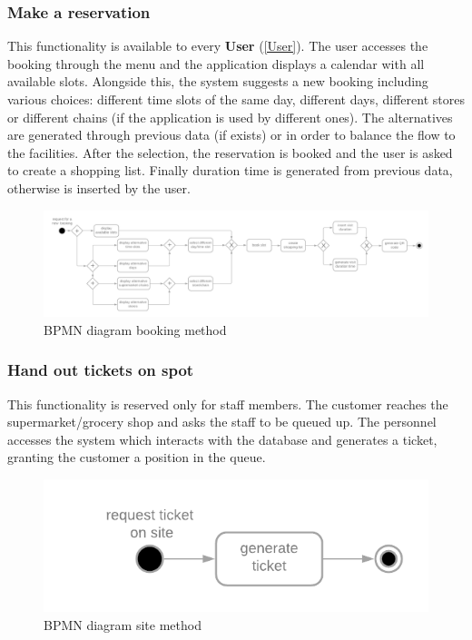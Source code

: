 \documentclass[table, 12pt]{article}
\begin{document}
\begin{flushleft}
    \subsubsection{Make a reservation}
    \label{book_a_visit}
    This functionality is available to every \textbf{User} (\ref{User}). The user accesses the booking through the menu and the application displays a calendar with all available slots. Alongside this, the system suggests a new booking including various choices: different time slots of the same day, different days, different stores or different chains (if the application is used by different ones). The alternatives are generated through previous data (if exists) or in order to balance the flow to the facilities. After the selection, the reservation is booked and the user is asked to create a shopping list. Finally duration time is generated from previous data, otherwise is inserted by the user.
    \begin{figure}[H]
        \begin{center}
            \includegraphics[scale=0.15]{assets/function-book-a-visit.png}
            \caption{BPMN diagram booking method}
        \end{center}
    \end{figure}
    \subsubsection{Hand out tickets on spot}

    This functionality is reserved only for staff members. The customer reaches the supermarket/grocery shop and asks the staff to be queued up. The personnel accesses the system which interacts with the database and generates a ticket, granting the customer a position in the queue.
    \begin{figure}[H]
        \begin{center}
            \includegraphics[scale=0.5]{assets/function-hand-up.png}
            \caption{BPMN diagram site method}
        \end{center}
    \end{figure}


\end{flushleft}
\end{document}
